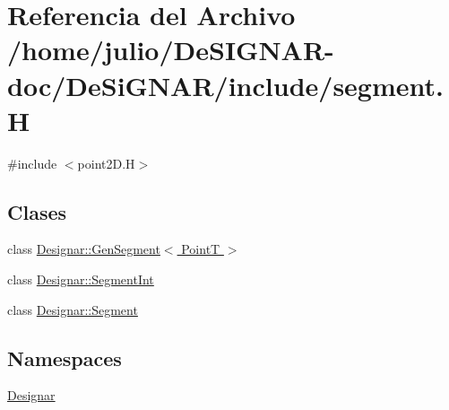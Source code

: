 \hypertarget{segment_8_h}{}\section{Referencia del Archivo /home/julio/\+De\+S\+I\+G\+N\+A\+R-\/doc/\+De\+Si\+G\+N\+A\+R/include/segment.H}
\label{segment_8_h}
{\ttfamily \#include $<$point2\+D.\+H$>$}\newline
\subsection*{Clases}
\begin{DoxyCompactItemize}
\item 
class \hyperlink{class_designar_1_1_gen_segment}{Designar\+::\+Gen\+Segment$<$ Point\+T $>$}
\item 
class \hyperlink{class_designar_1_1_segment_int}{Designar\+::\+Segment\+Int}
\item 
class \hyperlink{class_designar_1_1_segment}{Designar\+::\+Segment}
\end{DoxyCompactItemize}
\subsection*{Namespaces}
\begin{DoxyCompactItemize}
\item 
 \hyperlink{namespace_designar}{Designar}
\end{DoxyCompactItemize}
